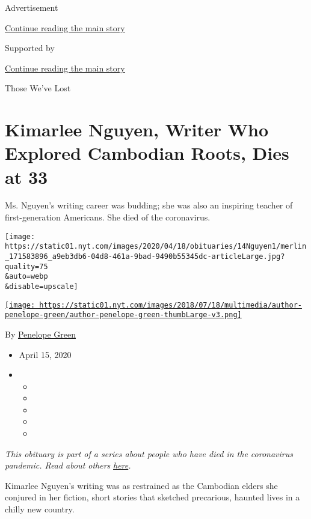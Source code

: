 Advertisement

\protect\hyperlink{after-top}{Continue reading the main story}

Supported by

\protect\hyperlink{after-sponsor}{Continue reading the main story}

Those We've Lost

\hypertarget{kimarlee-nguyen-writer-who-explored-cambodian-roots-dies-at-33}{%
\section{Kimarlee Nguyen, Writer Who Explored Cambodian Roots, Dies at
33}\label{kimarlee-nguyen-writer-who-explored-cambodian-roots-dies-at-33}}

Ms. Nguyen's writing career was budding; she was also an inspiring
teacher of first-generation Americans. She died of the coronavirus.

\texttt{[image: https://static01.nyt.com/images/2020/04/18/obituaries/14Nguyen1/merlin\_171583896\_a9eb3db6-04d8-461a-9bad-9490b55345dc-articleLarge.jpg?quality=75\\\&auto=webp\\\&disable=upscale]}

\href{https://www.nytimes.com/by/penelope-green}{\texttt{[image: https://static01.nyt.com/images/2018/07/18/multimedia/author-penelope-green/author-penelope-green-thumbLarge-v3.png]}}

By \href{https://www.nytimes.com/by/penelope-green}{Penelope Green}

\begin{itemize}
\item
  April 15, 2020
\item
  \begin{itemize}
  \item
  \item
  \item
  \item
  \item
  \end{itemize}
\end{itemize}

\emph{This obituary is part of a series about people who have died in
the coronavirus pandemic. Read about others}
\href{https://www.nytimes.com/series/people-who-have-died-of-the-coronavirus}{\emph{here}}\emph{.}

Kimarlee Nguyen's writing was as restrained as the Cambodian elders she
conjured in her fiction, short stories that sketched precarious, haunted
lives in a chilly new country.

